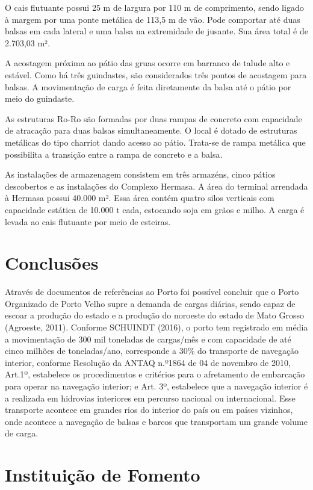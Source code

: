 \documentclass[article,12pt,onesidea,4paper,english,brazil]{abntex2}
\begin{document}
O cais flutuante possui 25 m de largura por 110 m de comprimento, sendo ligado à margem por uma ponte metálica de 113,5 m de vão. Pode comportar até duas balsas em cada lateral e uma balsa na extremidade de jusante. Sua área total é de 2.703,03 m².

A acostagem próxima ao pátio das gruas ocorre em barranco de talude alto e estável. Como há três guindastes, são considerados três pontos de acostagem para balsas. A movimentação de carga é feita diretamente da balsa até o pátio por meio do guindaste.

As estruturas Ro-Ro são formadas por duas rampas de concreto com capacidade de atracação para duas balsas simultaneamente. O local é dotado de estruturas metálicas do tipo charriot dando acesso ao pátio. Trata-se de rampa metálica que possibilita a transição entre a rampa de concreto e a balsa.

As instalações de armazenagem consistem em três armazéns, cinco pátios descobertos e as instalações do Complexo Hermasa. A área do terminal arrendada à Hermasa possui 40.000 m². Essa área contém quatro silos verticais com capacidade estática de 10.000 t cada, estocando soja em grãos e milho. A carga é levada ao cais flutuante por meio de esteiras.

	\section*{Conclusões}
	
Através de documentos de referências ao Porto foi possível concluir que o Porto Organizado de Porto Velho supre a demanda de cargas diárias, sendo capaz de escoar a produção do estado e a produção do noroeste do estado de Mato Grosso (Agroeste, 2011). Conforme SCHUINDT (2016), o porto tem registrado em média a movimentação de 300 mil toneladas de cargas/mês e com capacidade de até cinco milhões de toneladas/ano, corresponde a 30\% do transporte de navegação interior, conforme Resolução da ANTAQ n.º1864 de 04 de novembro de 2010, Art.1º, estabelece os procedimentos e critérios para o afretamento de embarcação para operar na navegação interior; e Art. 3º, estabelece que a navegação interior é a realizada em hidrovias interiores em percurso nacional ou internacional. Esse transporte acontece em grandes rios do interior do país ou em países vizinhos, onde acontece a navegação de balsas e barcos que transportam um grande volume de carga.
	
	\section*{Instituição de Fomento}
	
\end{document}
